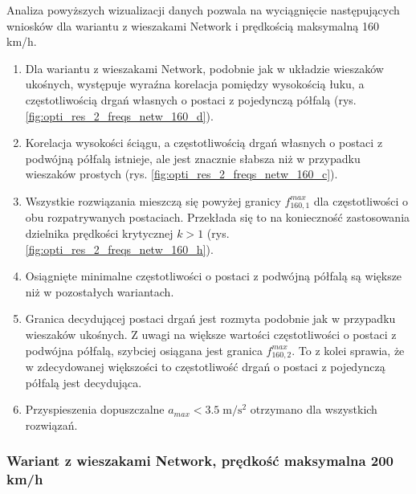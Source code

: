 Analiza powyższych wizualizacji danych pozwala na wyciągnięcie następujących wniosków dla wariantu z wieszakami Network i prędkością maksymalną 160 km/h.
\begin{enumerate}
	
	\item Dla wariantu z wieszakami Network, podobnie jak w układzie wieszaków ukośnych, występuje wyraźna korelacja pomiędzy wysokością łuku, a częstotliwością drgań własnych o postaci z pojedynczą półfalą (rys. \ref{fig:opti_res_2_freqs_netw_160_d}).
	\item Korelacja wysokości ściągu, a częstotliwością drgań własnych o postaci z podwójną półfalą istnieje, ale jest znacznie słabsza niż w przypadku wieszaków prostych (rys. \ref{fig:opti_res_2_freqs_netw_160_c}).
	\item Wszystkie rozwiązania mieszczą się powyżej granicy $f_{160,1}^{max}$ dla częstotliwości o obu rozpatrywanych postaciach. Przekłada się to na konieczność zastosowania dzielnika prędkości krytycznej $k>1$ (rys. \ref{fig:opti_res_2_freqs_netw_160_h}). 
	\item Osiągnięte minimalne częstotliwości o postaci z podwójną półfalą są większe niż w pozostałych wariantach.
	\item Granica decydującej postaci drgań jest rozmyta podobnie jak w przypadku wieszaków ukośnych. Z uwagi na większe wartości częstotliwości o postaci z podwójna półfalą, szybciej osiągana jest granica $f_{160,2}^{max}$. To z kolei sprawia, że w zdecydowanej większości to częstotliwość drgań o postaci z pojedynczą półfalą jest decydująca.
	\item Przyspieszenia dopuszczalne $a_{max}<3.5\;\mathrm{m/s^2}$ otrzymano dla wszystkich rozwiązań.
	
\end{enumerate}
\vfill






\subsubsection{Wariant z wieszakami Network, prędkość maksymalna 200 km/h}


